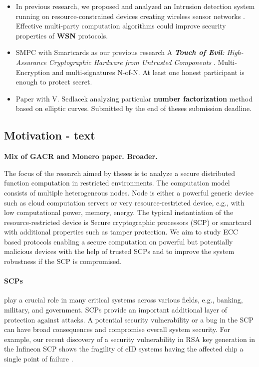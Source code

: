 \documentclass[
  digital, %
  twoside, %
  table,   %
  lof,     %
  lot,     %
]{fithesis3}
\newcounter{ph4_show_guides}
\theoremstyle{definition}
\theoremstyle{remark}
\begin{document}
\begin{ecmmnt}
\begin{itemize}
    \item In previous research, we proposed and analyzed an Intrusion detection system running on resource-constrained devices creating wireless sensor networks \cite{wsnprotectlayer}. Effective multi-party computation algorithms could improve security properties of {\bf{WSN}} protocols.
    
    \item SMPC with Smartcards as our previous research A {\it {\bf{Touch of Evil}}: High-Assurance Cryptographic Hardware from Untrusted Components} \cite{2017-ccs-mavroudis}. Multi-Encryption and multi-signatures N-of-N. At least one honest participant is enough to protect secret.
    
    \item Paper with V. Sedlacek analyzing particular {\bf{number factorization}} method based on elliptic curves. Submitted by the end of theses submission deadline.

\end{itemize}

\subsection{Motivation - text}

    {\bf{Mix of GACR and Monero paper. Broader.}}
    
    The focus of the research aimed by theses is to analyze a secure distributed function computation in restricted environments. The computation model consists of multiple heterogeneous nodes. Node is either a powerful generic device such as cloud computation servers or very resource-restricted device, e.g., with low computational power, memory, energy. The typical instantiation of the resource-restricted device is Secure cryptographic processors (SCP) or smartcard with additional properties such as tamper protection. 
    We aim to study ECC based protocols enabling a secure computation on powerful but potentially malicious devices with the help of trusted SCPs and to improve the system robustness if the SCP is compromised.
    
    \paragraph{SCPs} play a crucial role in many critical systems across various fields, e.g., banking, military, and government.
    SCPs provide an important additional layer of protection against attacks. A potential security vulnerability or a bug in the SCP can have broad consequences and compromise overall system security. For example, our recent discovery of a security vulnerability in RSA key generation in the Infineon SCP shows the fragility of eID systems having the affected chip a single point of failure \cite{2017-ccs-nemec}. 
    

\end{ecmmnt}
\end{document}
